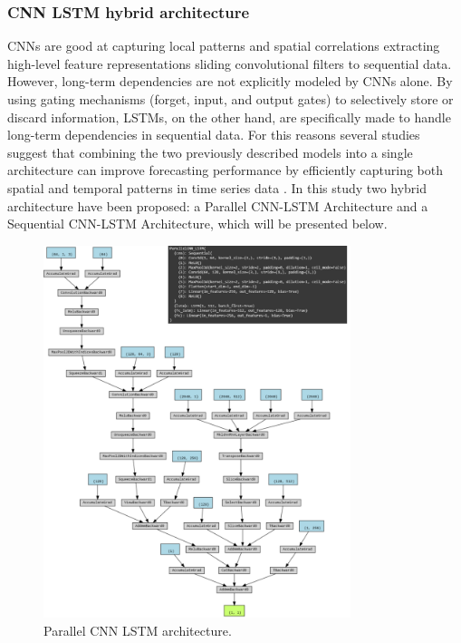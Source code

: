 \subsubsection{CNN LSTM hybrid architecture}


CNNs are good at capturing local patterns and spatial correlations extracting high-level feature representations sliding convolutional filters to sequential data. However, long-term dependencies are not explicitly modeled by CNNs alone. By using gating mechanisms (forget, input, and output gates) to selectively store or discard information, LSTMs, on the other hand, are specifically made to handle long-term dependencies in sequential data. For this reasons several studies suggest that combining the two previously described models into a single architecture can improve forecasting performance by efficiently capturing both spatial and temporal patterns in time series data \cite{zhao2017}. In this study two hybrid architecture have been proposed: a Parallel CNN-LSTM Architecture and a Sequential CNN-LSTM Architecture, which will be presented below.
 \begin{figure}[H]
    \centering
    \includegraphics[width=0.8\textwidth]{Machine_learning_thesis/Images/ParallelCNN_LSTM architecture.png}
    \caption{Parallel CNN LSTM architecture.} 
    \label{fig:Parallel CNN LSTM architecture}
\end{figure}
